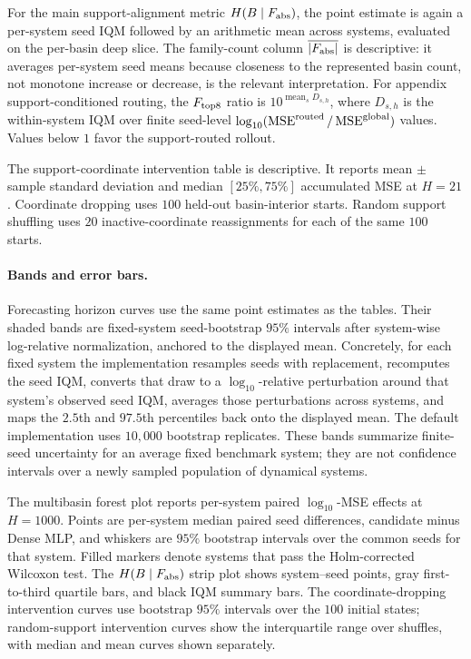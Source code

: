 For the main support-alignment metric \(H(B\mid F_{\rm abs})\), the point estimate is again a per-system seed IQM followed by an arithmetic mean across systems, evaluated on the per-basin deep slice. The family-count column \(\overline{|F_{\rm abs}|}\) is descriptive: it averages per-system seed means because closeness to the represented basin count, not monotone increase or decrease, is the relevant interpretation. For appendix support-conditioned routing, the \(F_{\rm top8}\) ratio is \(10^{\operatorname{mean}_s D_{s,h}}\), where \(D_{s,h}\) is the within-system IQM over finite seed-level \(\log_{10}(\operatorname{MSE}^{\rm routed}/\operatorname{MSE}^{\rm global})\) values. Values below \(1\) favor the support-routed rollout.

The support-coordinate intervention table is descriptive. It reports mean \(\pm\) sample standard deviation and median \([25\%,75\%]\) accumulated MSE at \(H=21\). Coordinate dropping uses \(100\) held-out basin-interior starts. Random support shuffling uses \(20\) inactive-coordinate reassignments for each of the same \(100\) starts.

\paragraph{Bands and error bars.}
Forecasting horizon curves use the same point estimates as the tables. Their shaded bands are fixed-system seed-bootstrap \(95\%\) intervals after system-wise log-relative normalization, anchored to the displayed mean. Concretely, for each fixed system the implementation resamples seeds with replacement, recomputes the seed IQM, converts that draw to a \(\log_{10}\)-relative perturbation around that system's observed seed IQM, averages those perturbations across systems, and maps the \(2.5\)th and \(97.5\)th percentiles back onto the displayed mean. The default implementation uses \(10{,}000\) bootstrap replicates. These bands summarize finite-seed uncertainty for an average fixed benchmark system; they are not confidence intervals over a newly sampled population of dynamical systems.

The multibasin forest plot reports per-system paired \(\log_{10}\)-MSE effects at \(H=1000\). Points are per-system median paired seed differences, candidate minus Dense MLP, and whiskers are \(95\%\) bootstrap intervals over the common seeds for that system. Filled markers denote systems that pass the Holm-corrected Wilcoxon test. The \(H(B\mid F_{\rm abs})\) strip plot shows system--seed points, gray first-to-third quartile bars, and black IQM summary bars. The coordinate-dropping intervention curves use bootstrap \(95\%\) intervals over the \(100\) initial states; random-support intervention curves show the interquartile range over shuffles, with median and mean curves shown separately.

